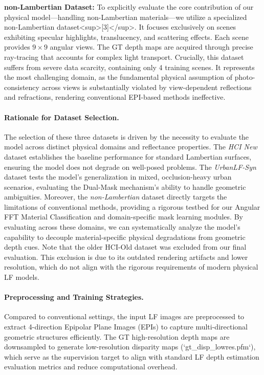 \textbf{non-Lambertian Dataset:} To explicitly evaluate the core contribution of our physical model—handling non-Lambertian materials—we utilize a specialized non-Lambertian dataset<sup>[3]</sup>. It focuses exclusively on scenes exhibiting specular highlights, translucency, and scattering effects. Each scene provides $9 \times 9$ angular views. The GT depth maps are acquired through precise ray-tracing that accounts for complex light transport. Crucially, this dataset suffers from severe data scarcity, containing only 4 training scenes. It represents the most challenging domain, as the fundamental physical assumption of photo-consistency across views is substantially violated by view-dependent reflections and refractions, rendering conventional EPI-based methods ineffective.

\paragraph{Rationale for Dataset Selection.}

The selection of these three datasets is driven by the necessity to evaluate the model across distinct physical domains and reflectance properties. The \textit{HCI New} dataset establishes the baseline performance for standard Lambertian surfaces, ensuring the model does not degrade on well-posed problems. The \textit{UrbanLF-Syn} dataset tests the model's generalization in mixed, occlusion-heavy urban scenarios, evaluating the Dual-Mask mechanism's ability to handle geometric ambiguities. Moreover, the \textit{non-Lambertian} dataset directly targets the limitations of conventional methods, providing a rigorous testbed for our Angular FFT Material Classification and domain-specific mask learning modules. By evaluating across these domains, we can systematically analyze the model's capability to decouple material-specific physical degradations from geometric depth cues. Note that the older HCI-Old dataset was excluded from our final evaluation. This exclusion is due to its outdated rendering artifacts and lower resolution, which do not align with the rigorous requirements of modern physical LF models.

\paragraph{Preprocessing and Training Strategies.}

Compared to conventional settings, the input LF images are preprocessed to extract 4-direction Epipolar Plane Images (EPIs) to capture multi-directional geometric structures efficiently. The GT high-resolution depth maps are downsampled to generate low-resolution disparity maps (`gt_disp_lowres.pfm`), which serve as the supervision target to align with standard LF depth estimation evaluation metrics and reduce computational overhead.

